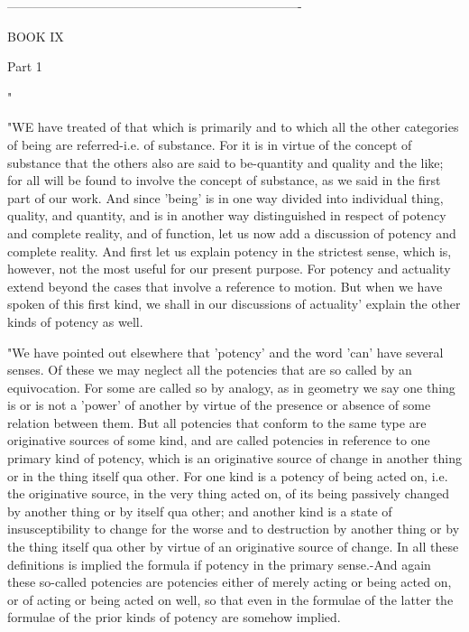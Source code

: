 ----------------------------------------------------------------------

BOOK IX

Part 1 

"

"WE have treated of that which is primarily and to which all the other
categories of being are referred-i.e. of substance. For it is in virtue
of the concept of substance that the others also are said to be-quantity
and quality and the like; for all will be found to involve the concept
of substance, as we said in the first part of our work. And since
'being' is in one way divided into individual thing, quality, and
quantity, and is in another way distinguished in respect of potency
and complete reality, and of function, let us now add a discussion
of potency and complete reality. And first let us explain potency
in the strictest sense, which is, however, not the most useful for
our present purpose. For potency and actuality extend beyond the cases
that involve a reference to motion. But when we have spoken of this
first kind, we shall in our discussions of actuality' explain the
other kinds of potency as well. 

"We have pointed out elsewhere that 'potency' and the word 'can' have
several senses. Of these we may neglect all the potencies that are
so called by an equivocation. For some are called so by analogy, as
in geometry we say one thing is or is not a 'power' of another by
virtue of the presence or absence of some relation between them. But
all potencies that conform to the same type are originative sources
of some kind, and are called potencies in reference to one primary
kind of potency, which is an originative source of change in another
thing or in the thing itself qua other. For one kind is a potency
of being acted on, i.e. the originative source, in the very thing
acted on, of its being passively changed by another thing or by itself
qua other; and another kind is a state of insusceptibility to change
for the worse and to destruction by another thing or by the thing
itself qua other by virtue of an originative source of change. In
all these definitions is implied the formula if potency in the primary
sense.-And again these so-called potencies are potencies either of
merely acting or being acted on, or of acting or being acted on well,
so that even in the formulae of the latter the formulae of the prior
kinds of potency are somehow implied. 

